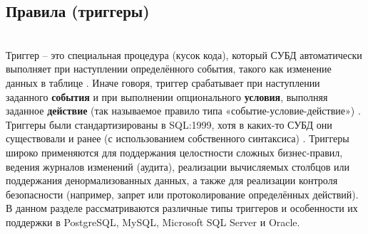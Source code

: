 \subsection{Правила (триггеры)} ~\\

 Триггер – это специальная процедура (кусок кода), который СУБД автоматически выполняет при наступлении определённого события, такого как изменение данных в таблице \autocite{Silberschatz}. Иначе говоря, триггер срабатывает при наступлении заданного \textbf{события} и при выполнении опционального \textbf{условия}, выполняя заданное \textbf{действие} (так называемое правило типа «событие-условие-действие») \autocite{ElmasriNavathe}. 
 Триггеры были стандартизированы в SQL:1999, хотя в каких-то СУБД они существовали и ранее (с использованием собственного синтаксиса) \autocite{Silberschatz}. Триггеры широко применяются для поддержания целостности сложных бизнес-правил, ведения журналов изменений (аудита), реализации вычисляемых столбцов или поддержания денормализованных данных, а также для реализации контроля безопасности (например, запрет или протоколирование определённых действий). В данном разделе рассматриваются различные типы триггеров и особенности их поддержки в PostgreSQL, MySQL, Microsoft SQL Server и Oracle.

